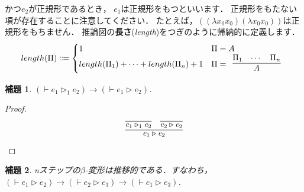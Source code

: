 \documentclass{ltjsbook}%
\newtheorem{lemma}{補題}[section]%
\newcommand\term[2]{\textbf{#1}{(\textit{#2})}}%
\begin{document}
かつ$\mathit{e}_2$が正規形であるとき，%
$\mathit{e}_1$は正規形をもつといいます．%
正規形をもたない項が存在することに注意してください．%
たとえば，$((\lambda x_0x_0)(\lambda x_0x_0))$は正規形をもちません．%
推論図の\term{長さ}{length}をつぎのように帰納的に定義します．%
\begin{equation}%
  length(\Pi)\Coloneqq\begin{cases}%
  1&\Pi=A\\%
  length(\Pi_1)+\cdots+length(\Pi_n)+1%
  &\Pi=\begin{array}{c}\infer{A}{\Pi_1&\cdots&\Pi_n}\end{array}%
  \end{cases}%
\end{equation}%
\begin{lemma}%
  \label{lemma:beta_reduct1n}%
  $(\vdash\mathit{e}_1\triangleright_1\mathit{e}_2)\rightarrow%
  (\vdash\mathit{e}_1\triangleright\mathit{e}_2)$.%
\end{lemma}%
\begin{proof}%
  \begin{equation}%
    \infer{%
      \mathit{e}_1\triangleright\mathit{e}_2%
    }{%
      \infer{\mathit{e}_1\triangleright_1\mathit{e}_2}{}%
    &%
      \infer{\mathit{e}_2\triangleright\mathit{e}_2}{}%
    }%
  \end{equation}%
\end{proof}%
\begin{lemma}%
  \label{lemma:beta_reduct_trans}%
  nステップの$\beta$-変形は推移的である．すなわち，%
  $(\vdash\mathit{e}_1\triangleright\mathit{e}_2)\rightarrow%
  (\vdash\mathit{e}_2\triangleright\mathit{e}_3)\rightarrow%
  (\vdash\mathit{e}_1\triangleright\mathit{e}_3)$.%
\end{lemma}%
\end{document}
